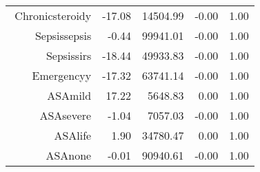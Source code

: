 \begin{tabular}{rrrrr}
$$  Chronic\-steroid\-y & -17.08 & 14504.99 & -0.00 & 1.00 \\ 
  Sepsis\-sepsis & -0.44 & 99941.01 & -0.00 & 1.00 \\ 
  Sepsis\-sirs & -18.44 & 49933.83 & -0.00 & 1.00 \\ 
  Emergency\-y & -17.32 & 63741.14 & -0.00 & 1.00 \\ 
  ASA\-mild & 17.22 & 5648.83 & 0.00 & 1.00 \\ 
  ASA\-severe & -1.04 & 7057.03 & -0.00 & 1.00 \\ 
  ASA\-life & 1.90 & 34780.47 & 0.00 & 1.00 \\ 
  ASA\-none & -0.01 & 90940.61 & -0.00 & 1.00 \\ 
   \hline
\end{tabular}

